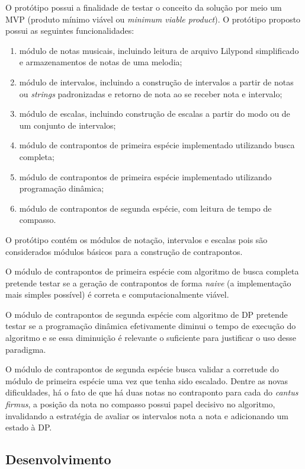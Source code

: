     O protótipo possui a finalidade de testar o conceito da solução por meio um MVP (produto mínimo viável ou \textit{minimum viable product}). O protótipo proposto possui as seguintes funcionalidades:

    \begin{enumerate}
      \item módulo de notas musicais, incluindo leitura de arquivo Lilypond simplificado e armazenamentos de notas de uma melodia;
      \item módulo de intervalos, incluindo a construção de intervalos a partir de notas ou \textit{strings} padronizadas e retorno de nota ao se receber nota e intervalo;
      \item módulo de escalas, incluindo construção de escalas a partir do modo ou de um conjunto de intervalos;
      \item módulo de contrapontos de primeira espécie implementado utilizando busca completa;
      \item módulo de contrapontos de primeira espécie implementado utilizando programação dinâmica;
      \item módulo de contrapontos de segunda espécie, com leitura de tempo de compasso.
    \end{enumerate}

    O protótipo contém os módulos de notação, intervalos e escalas pois são considerados módulos básicos para a construção de contrapontos.

    O módulo de contrapontos de primeira espécie com algoritmo de busca completa pretende testar se a geração de contrapontos de forma \textit{naive} (a implementação mais simples possível) é correta e computacionalmente viável.

    O módulo de contrapontos de segunda espécie com algoritmo de DP pretende testar se a programação dinâmica efetivamente diminui o tempo de execução do algoritmo e se essa diminuição é relevante o suficiente para justificar o uso desse paradigma.

    O módulo de contrapontos de segunda espécie busca validar a corretude do módulo de primeira espécie uma vez que tenha sido escalado. Dentre as novas dificuldades, há o fato de que há duas notas no contraponto para cada do \textit{cantus firmus}, a posição da nota no compasso possui papel decisivo no algoritmo, invalidando a estratégia de avaliar os intervalos nota a nota e adicionando um estado à DP.

  \subsection[Desenvolvimento]{Desenvolvimento}

